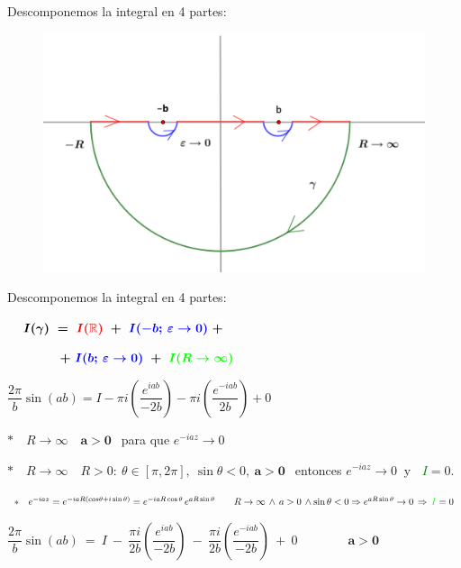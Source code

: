 \newpage %

\hspace{2cm} %

Descomponemos la integral en 4 partes: 

\begin{multicols}{2}
 \begin{figure}[H]
	\centering
	\includegraphics[width=.5\textwidth]{imagenes/img43-03bis.png}
\end{figure}
Descomponemos la integral en 4 partes: 

$\boldsymbol{ \quad I(\gamma) \ = \ \textcolor{red}{I(\mathbb R)} \ + \ \textcolor{blue}{I(-b;\, \varepsilon\to 0)} \ + }$

$\boldsymbol{ \qquad \qquad  + \ \textcolor{blue}{I(b;\, \varepsilon\to 0)} \ + \ \textcolor{green}{I(R\to \infty)} }$

$\dfrac{2\pi}b \sin(ab) = I -\pi i \left( \dfrac{e^{iab}}{-2b} \right) -\pi i \left( \dfrac{e^{-iab}}{2b}  \right) + 0$

$*  \quad R\to \infty \quad  \boldsymbol{a>0} \ \ $ para que $e^{-iaz}\to 0$

\end{multicols}

$ *  \quad R \to \infty \quad  R>0:\ \theta\in [\pi,2\pi],\ \sin\theta<0,\ \boldsymbol{a>0} \ \ $ entonces $e^{-iaz}\to 0\ $ y $\ $ \textcolor{green}{$I$}$=0$.


\begin{small} \textcolor{gris}{$*\quad  e^{-iaz}=e^{-iaR(cos\theta + i \sin \theta)}=e^{-iaR\cos \theta} \, e^{aR \sin \theta} \qquad R\to \infty \, \wedge \, a>0 \, \wedge \sin\theta<0 \Rightarrow  e^{aR \sin \theta} \to 0 \, \Rightarrow \, \textcolor{green}{I}=0$} \end{small}

$\dfrac{2\pi}{b} \sin (ab) \ = \  I \ - \  \dfrac{\pi i }{2b} \left( \dfrac{e^{iab}}{-2b} \right) \ - \    \dfrac{\pi i }{2b} \left( \dfrac{e^{-iab}}{-2b} \right) \ + \  0 \qquad \qquad \boldsymbol{a>0}$


